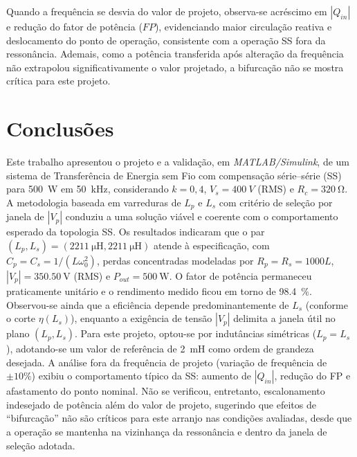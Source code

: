 \documentclass[conference]{IEEEtran}
\begin{document}
Quando a frequência se desvia do valor de projeto, observa-se acréscimo em $|Q_{in}|$ e redução do fator de potência ($FP$), evidenciando maior circulação reativa e deslocamento do ponto de operação, consistente com a operação SS fora da ressonância. Ademais, como a potência transferida após alteração da frequência não extrapolou significativamente o valor projetado, a bifurcação não se mostra crítica para este projeto.
\section{Conclusões}
Este trabalho apresentou o projeto e a validação, em \emph{MATLAB/Simulink}, de um sistema de Transferência de Energia sem Fio com compensação série–série (SS) para \SI{500}{W} em \SI{50}{\kilo\hertz}, considerando $k{=}0{,}4$, $V_s{=}\SI{400}{V}$ (RMS) e $R_c{=}\SI{320}{\ohm}$. A metodologia baseada em varreduras de $L_p$ e $L_s$ com critério de seleção por janela de $|V_p|$ conduziu a uma solução viável e coerente com o comportamento esperado da topologia SS.
Os resultados indicaram que o par $(L_p,L_s)=(\SI{2211}{\micro\henry},\SI{2211}{\micro\henry})$ atende à especificação, com $C_p{=}C_s{=}1/(L\omega_0^2)$, perdas concentradas modeladas por $R_p{=}R_s{=}{1000}L$, $|V_p|{=}\SI{350.50}{\volt}$ (RMS) e $P_{out}{=}\SI{500}{\watt}$. O fator de potência permaneceu praticamente unitário e o rendimento medido ficou em torno de \SI{98.4}{\percent}. Observou-se ainda que a eficiência depende predominantemente de $L_s$ (conforme o corte $\eta(L_s)$), enquanto a exigência de tensão $|V_p|$ delimita a janela útil no plano $(L_p,L_s)$. Para este projeto, optou-se por indutâncias simétricas ($L_p = L_s$), adotando-se um valor de referência de \SI{2}{\milli\henry} como ordem de grandeza desejada.
A análise fora da frequência de projeto (variação de frequência de \(\pm10\%\)) exibiu o comportamento típico da SS: aumento de \(|Q_{in}|\), redução do FP e afastamento do ponto nominal. Não se verificou, entretanto, escalonamento indesejado de potência além do valor de projeto, sugerindo que efeitos de “bifurcação” não são críticos para este arranjo nas condições avaliadas, desde que a operação se mantenha na vizinhança da ressonância e dentro da janela de seleção adotada.


\end{document}
